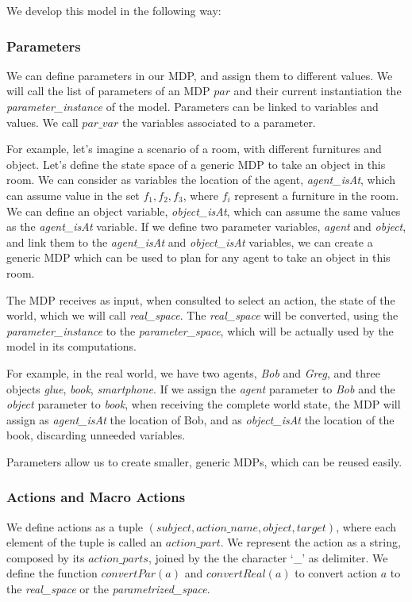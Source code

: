  We develop this model in the following way:

\subsubsection{Parameters}
We can define parameters in our MDP, and assign them to different values. We will call the list of parameters of an MDP $par$ and their current instantiation the \textit{parameter\_instance} of the model. Parameters can be linked to variables and values. We call $par\_var$ the variables associated to a parameter. 

For example, let's imagine a scenario of a room, with different furnitures and object. Let's define the state space of a generic MDP to take an object in this room. We can consider as variables the location of the agent, \textit{agent\_isAt}, which can assume value in the set ${f_1, f_2, f_3}$, where $f_i$ represent a furniture in the room. We can define an object variable, \textit{object\_isAt}, which can assume the same values as the \textit{agent\_isAt} variable. If we define two parameter variables, \textit{agent} and \textit{object}, and link them to the \textit{agent\_isAt} and \textit{object\_isAt} variables, we can create a generic MDP which can be used to plan for any agent to take an object in this room.

The MDP receives as input, when consulted to select an action, the state of the world,  which we will call \textit{real\_space}. The \textit{real\_space} will be converted, using the \textit{parameter\_instance} to the \textit{parameter\_space}, which will be actually used by the model in its computations. 

For example, in the real world, we have two agents, \textit{Bob} and \textit{Greg}, and three objects \textit{glue}, \textit{book}, \textit{smartphone}. If we assign the \textit{agent} parameter to \textit{Bob} and the \textit{object} parameter to \textit{book}, when receiving the complete world state, the MDP will assign as \textit{agent\_isAt} the location of Bob, and as \textit{object\_isAt} the location of the book, discarding unneeded variables.

Parameters allow us to create smaller, generic MDPs, which can be reused easily.


\subsubsection{Actions and Macro Actions}
We define actions as a tuple $(subject,action\_name,object,target)$, where each element of the tuple is called an $action\_part$.  We represent the action as a string, composed by its $action\_parts$, joined by the the character `\_' as delimiter. We define the function $convertPar(a)$ and $convertReal(a)$ to convert action $a$ to the \textit{real\_space} or the \textit{parametrized\_space}.

